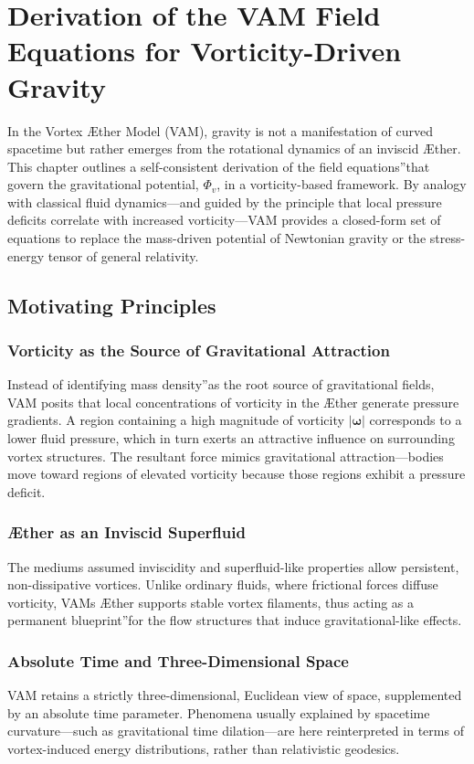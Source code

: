 \section{Derivation of the VAM Field Equations for Vorticity-Driven Gravity}
In the Vortex Æther Model (VAM), gravity is not a manifestation of curved spacetime but rather emerges from the rotational dynamics of an inviscid Æther. This chapter outlines a self-consistent derivation of the \grqq field equations\textquotedblright that govern the gravitational potential, \(\Phi_v\), in a vorticity-based framework. By analogy with classical fluid dynamics—and guided by the principle that local pressure deficits correlate with increased vorticity—VAM provides a closed-form set of equations to replace the mass-driven potential of Newtonian gravity or the stress-energy tensor of general relativity.

\subsection{Motivating Principles}
\subsubsection{Vorticity as the Source of Gravitational Attraction}
Instead of identifying \grqq mass density\textquotedblright as the root source of gravitational fields, VAM posits that local concentrations of vorticity in the Æther generate pressure gradients. A region containing a high magnitude of vorticity \(\lvert \boldsymbol{\omega} \rvert\) corresponds to a lower fluid pressure, which in turn exerts an attractive influence on surrounding vortex structures. The resultant force mimics gravitational attraction—bodies move toward regions of elevated vorticity because those regions exhibit a pressure deficit.

\subsubsection{Æther as an Inviscid Superfluid}
The medium\rqs s assumed inviscidity and superfluid-like properties allow persistent, non-dissipative vortices. Unlike ordinary fluids, where frictional forces diffuse vorticity, VAM\rqs s Æther supports stable vortex filaments, thus acting as a permanent \grqq blueprint\textquotedblright for the flow structures that induce gravitational-like effects.

\subsubsection{Absolute Time and Three-Dimensional Space}
VAM retains a strictly three-dimensional, Euclidean view of space, supplemented by an absolute time parameter. Phenomena usually explained by spacetime curvature—such as gravitational time dilation—are here reinterpreted in terms of vortex-induced energy distributions, rather than relativistic geodesics.

